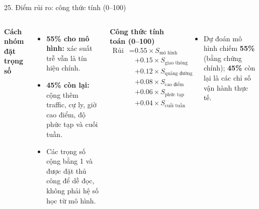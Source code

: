\documentclass[t, aspectratio=169, 11pt]{beamer}
\newcommand{\blk}[1]{\textbf{\color{hustprimary}#1}}
\begin{document}
\begin{frame}{25. Điểm rủi ro: công thức tính (0--100)}
    \begin{columns}[T]
        \blk{Cách nhóm đặt trọng số}
        \begin{itemize}
            \item \textbf{55\% cho mô hình:} xác suất trễ vẫn là tín hiệu chính.
            \item \textbf{45\% còn lại:} cộng thêm traffic, cự ly, giờ cao điểm, độ phức tạp và cuối tuần.
            \item Các trọng số cộng bằng 1 và được đặt thủ công để dễ đọc, không phải hệ số học từ mô hình.
        \end{itemize}

        \blk{Công thức tính toán (0--100)}
        {\scriptsize
        \begin{equation*}
        \begin{aligned}
            \text{Rủi ro} = {} & 0.55 \times S_{\text{mô hình}} \\
            & + 0.15 \times S_{\text{giao thông}} \\
            & + 0.12 \times S_{\text{quãng đường}} \\
            & + 0.08 \times S_{\text{cao điểm}} \\
            & + 0.06 \times S_{\text{phức tạp}} \\
            & + 0.04 \times S_{\text{cuối tuần}}
        \end{aligned}
        \end{equation*}
        }
        \vspace{-0.15cm}
        \begin{itemize}\scriptsize
            \item Dự đoán mô hình chiếm \textbf{55\%} (bằng chứng chính); \textbf{45\%} còn lại là các chỉ số vận hành thực tế.
        \end{itemize}
    \end{columns}
\end{frame}
\end{document}

